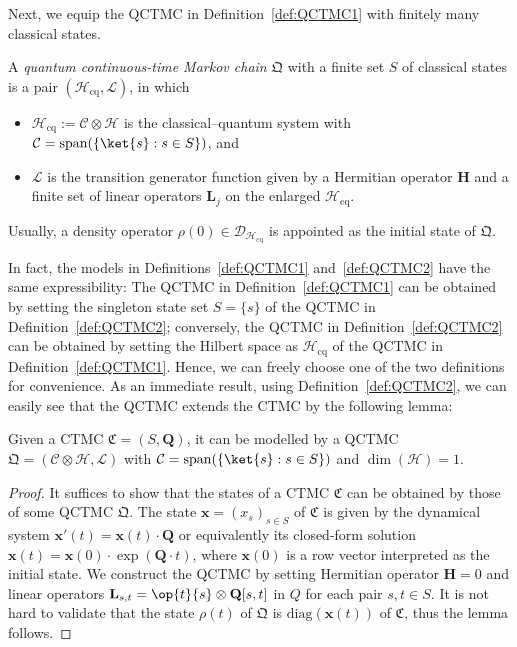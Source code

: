 \documentclass[a4paper,UKenglish,cleveref,autoref,thm-restate,authorcolumns]{lipics-v2019}
\newcommand{\QC}{\mathfrak{Q}}
\newcommand{\h}{\mathcal{H}}
\renewcommand{\L}{\mathcal{L}}
\newcommand{\D}{\mathcal{D}}
\newcommand{\HH}{\mathbf{H}}
\newcommand{\LL}{\mathbf{L}}
\newcommand{\cq}{\mathrm{cq}}
\newcommand{\spn}{\mathrm{span}}
\newcommand{\diag}{\mathrm{diag}}
\newcommand{\x}{\mathbf{x}}
\begin{document}
Next, we equip the QCTMC in Definition~\ref{def:QCTMC1}
with finitely many classical states.
\begin{definition}\label{def:QCTMC2}
	A \emph{quantum continuous-time Markov chain} $\QC$	with a finite set $S$ of classical states
	is a pair $(\h_\cq,\L)$, in which
	\begin{itemize}
		\item $\h_\cq:=\mathcal{C} \otimes \h$ is the classical--quantum system
		with $\mathcal{C}=\spn(\{\ket{s}: s\in S\})$, and
		\item $\L$ is the transition generator function given by
		a Hermitian operator $\HH$
		and a finite set of linear operators $\LL_j$ on the enlarged $\h_\cq$.
	\end{itemize}
	Usually, a density operator $\rho(0) \in \D_{\h_\cq}$
	is appointed as the initial state of $\QC$.
\end{definition}

In fact, the models in Definitions~\ref{def:QCTMC1} and~\ref{def:QCTMC2}
have the same expressibility:
The QCTMC in Definition~\ref{def:QCTMC1} can be obtained
by setting the singleton state set $S=\{s\}$ of the QCTMC in Definition~\ref{def:QCTMC2};
conversely, the QCTMC in Definition~\ref{def:QCTMC2} can be obtained
by setting the Hilbert space as $\h_\cq$ of the QCTMC in Definition~\ref{def:QCTMC1}.
Hence, we can freely choose one of the two definitions for convenience.
As an immediate result, using Definition~\ref{def:QCTMC2},
we can easily see that the QCTMC extends the CTMC by the following lemma:
\begin{lemma}
	Given a CTMC $\mathfrak{C}=(S,\mathbf{Q})$,
	it can be modelled by a QCTMC $\QC=(\mathcal{C} \otimes \h,\L)$
	with $\mathcal{C}=\spn(\{\ket{s}:s\in S\})$ and $\dim(\h)=1$.
\end{lemma}
\begin{proof}
    It suffices to show that
    the states of a CTMC $\mathfrak{C}$ can be obtained by those of some QCTMC $\QC$.
	The state $\x=(x_s)_{s \in S}$ of $\mathfrak{C}$ is given by
	the dynamical system $\x'(t)=\x(t) \cdot \mathbf{Q}$
	or equivalently its closed-form solution
	$\x(t)=\x(0) \cdot \exp(\mathbf{Q}\cdot t)$,
	where $\x(0)$ is a row vector interpreted as the initial state.
	We construct the QCTMC by setting Hermitian operator $\HH=0$
	and linear operators $\LL_{s,t}=\op{t}{s}\otimes \mathbf{Q}[s,t]$ in $Q$
	for each pair $s,t \in S$.
	It is not hard to validate that the state $\rho(t)$ of $\QC$
	is $\diag(\x(t))$ of $\mathfrak{C}$,
	thus the lemma follows.
\end{proof}
	
\end{document}
